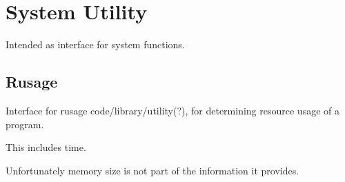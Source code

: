 \section{System Utility}

Intended as interface for system functions.

\subsection{Rusage}
Interface for rusage code/library/utility(?), for determining resource
usage of a program.

This includes time.

Unfortunately memory size is not part of the information it provides.
